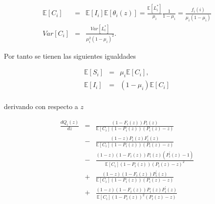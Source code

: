 \documentclass{article}
\newcommand{\esp}{\mathbb{E}}
\begin{document}
\begin{eqnarray*}
\esp\left[C_{i}\right]&=&\esp\left[I_{i}\right]\esp\left[\theta_{i}\left(z\right)\right]=\frac{\esp\left[L_{i}^{*}\right]}{\mu_{i}}\frac{1}{1-\mu_{i}}=\frac{f_{i}\left(i\right)}{\mu_{i}\left(1-\mu_{i}\right)}\\
Var\left[C_{i}\right]&=&\frac{Var\left[L_{i}^{*}\right]}{\mu_{i}^{2}\left(1-\mu_{i}\right)^{2}}.
\end{eqnarray*}

Por tanto se tienen las siguientes igualdades


\begin{eqnarray*}
\esp\left[S_{i}\right]&=&\mu_{i}\esp\left[C_{i}\right],\\
\esp\left[I_{i}\right]&=&\left(1-\mu_{i}\right)\esp\left[C_{i}\right]\\
\end{eqnarray*}

derivando con respecto a $z$



\begin{eqnarray*}
\frac{d Q_{i}\left(z\right)}{d z}&=&\frac{\left(1-F_{i}\left(z\right)\right)P_{i}\left(z\right)}{\esp\left[C_{i}\right]\left(1-P_{i}\left(z\right)\right)\left(P_{i}\left(z\right)-z\right)}\\
&-&\frac{\left(1-z\right)P_{i}\left(z\right)F_{i}^{'}\left(z\right)}{\esp\left[C_{i}\right]\left(1-P_{i}\left(z\right)\right)\left(P_{i}\left(z\right)-z\right)}\\
&-&\frac{\left(1-z\right)\left(1-F_{i}\left(z\right)\right)P_{i}\left(z\right)\left(P_{i}^{'}\left(z\right)-1\right)}{\esp\left[C_{i}\right]\left(1-P_{i}\left(z\right)\right)\left(P_{i}\left(z\right)-z\right)^{2}}\\
&+&\frac{\left(1-z\right)\left(1-F_{i}\left(z\right)\right)P_{i}^{'}\left(z\right)}{\esp\left[C_{i}\right]\left(1-P_{i}\left(z\right)\right)\left(P_{i}\left(z\right)-z\right)}\\
&+&\frac{\left(1-z\right)\left(1-F_{i}\left(z\right)\right)P_{i}\left(z\right)P_{i}^{'}\left(z\right)}{\esp\left[C_{i}\right]\left(1-P_{i}\left(z\right)\right)^{2}\left(P_{i}\left(z\right)-z\right)}
\end{eqnarray*}
\end{document}
